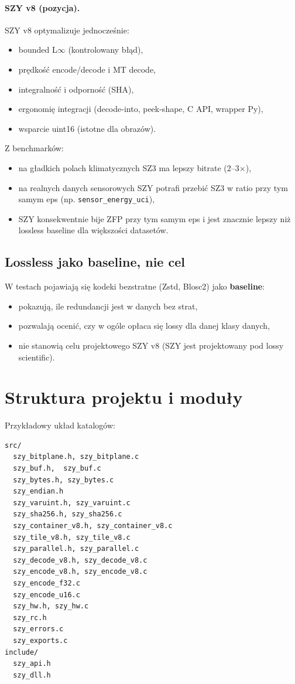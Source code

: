\documentclass[11pt,a4paper]{article}
\begin{document}
\paragraph{SZY v8 (pozycja).}
SZY v8 optymalizuje jednocześnie:
\begin{itemize}
  \item bounded L$\infty$ (kontrolowany błąd),
  \item prędkość encode/decode i MT decode,
  \item integralność i odporność (SHA),
  \item ergonomię integracji (decode-into, peek-shape, C API, wrapper Py),
  \item wsparcie uint16 (istotne dla obrazów).
\end{itemize}
Z benchmarków:
\begin{itemize}
  \item na gładkich polach klimatycznych SZ3 ma lepszy bitrate (2--3$\times$),
  \item na realnych danych sensorowych SZY potrafi przebić SZ3 w ratio przy tym samym eps (np. \texttt{sensor\_energy\_uci}),
  \item SZY konsekwentnie bije ZFP przy tym samym eps i jest znacznie lepszy niż lossless baseline dla większości datasetów.
\end{itemize}

\subsection{Lossless jako baseline, nie cel}
W testach pojawiają się kodeki bezstratne (Zstd, Blosc2) jako \textbf{baseline}:
\begin{itemize}
  \item pokazują, ile redundancji jest w danych bez strat,
  \item pozwalają ocenić, czy w ogóle opłaca się lossy dla danej klasy danych,
  \item nie stanowią celu projektowego SZY v8 (SZY jest projektowany pod lossy scientific).
\end{itemize}

\section{Struktura projektu i moduły}
Przykładowy układ katalogów:
\begin{verbatim}
src/
  szy_bitplane.h, szy_bitplane.c
  szy_buf.h,  szy_buf.c
  szy_bytes.h, szy_bytes.c
  szy_endian.h
  szy_varuint.h, szy_varuint.c
  szy_sha256.h, szy_sha256.c
  szy_container_v8.h, szy_container_v8.c
  szy_tile_v8.h, szy_tile_v8.c
  szy_parallel.h, szy_parallel.c
  szy_decode_v8.h, szy_decode_v8.c
  szy_encode_v8.h, szy_encode_v8.c
  szy_encode_f32.c
  szy_encode_u16.c
  szy_hw.h, szy_hw.c
  szy_rc.h
  szy_errors.c
  szy_exports.c
include/
  szy_api.h
  szy_dll.h
\end{verbatim}
\end{document}
